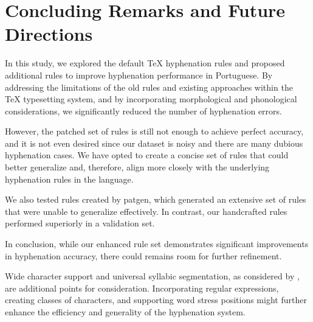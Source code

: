 \section{Concluding Remarks and Future Directions}\label{sec-conclusion}

In this study, we explored the default TeX hyphenation rules and proposed
additional rules to improve hyphenation performance in Portuguese. By
addressing the limitations of the old rules and existing approaches within the
TeX typesetting system, and by incorporating morphological and phonological
considerations, we significantly reduced the number of hyphenation errors.

However, the patched set of rules is still not enough to achieve perfect
accuracy, and it is not even desired since our dataset is noisy and there are
many dubious hyphenation cases. We have opted to create a concise set of rules
that could better generalize and, therefore, align more closely with the
underlying hyphenation rules in the language.

We also tested rules created by patgen, which generated an extensive set of
rules that were unable to generalize effectively. In contrast, our handcrafted
rules performed superiorly in a validation set.

In conclusion, while our enhanced rule set demonstrates significant
improvements in hyphenation accuracy, there could remains room for further
refinement.

Wide character support and universal syllabic segmentation, as considered by
\cite{sojka2023roadmap}, are additional points for consideration. Incorporating
regular expressions, creating classes of characters, and supporting word stress
positions might further enhance the efficiency and generality of the
hyphenation system.


